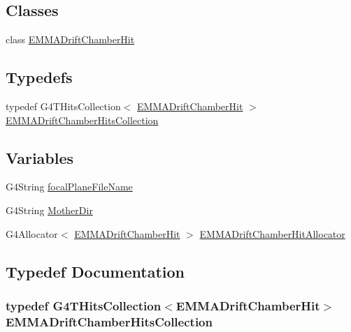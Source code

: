 \subsection*{Classes}
\begin{DoxyCompactItemize}
\item 
class \hyperlink{classEMMADriftChamberHit}{E\+M\+M\+A\+Drift\+Chamber\+Hit}
\end{DoxyCompactItemize}
\subsection*{Typedefs}
\begin{DoxyCompactItemize}
\item 
typedef G4\+T\+Hits\+Collection$<$ \hyperlink{classEMMADriftChamberHit}{E\+M\+M\+A\+Drift\+Chamber\+Hit} $>$ \hyperlink{EMMADriftChamberHit_8hh_a22ef55da69b903e8da573af3049cf972}{E\+M\+M\+A\+Drift\+Chamber\+Hits\+Collection}
\end{DoxyCompactItemize}
\subsection*{Variables}
\begin{DoxyCompactItemize}
\item 
G4\+String \hyperlink{EMMADriftChamberHit_8hh_a3dbaf7156a8d958508b9806a0ef50aa6}{focal\+Plane\+File\+Name}
\item 
G4\+String \hyperlink{EMMADriftChamberHit_8hh_a28a3faf9b4768b420044f0d81fa645b7}{Mother\+Dir}
\item 
G4\+Allocator$<$ \hyperlink{classEMMADriftChamberHit}{E\+M\+M\+A\+Drift\+Chamber\+Hit} $>$ \hyperlink{EMMADriftChamberHit_8hh_a69d77018fbd217765f66a3ea52ee314f}{E\+M\+M\+A\+Drift\+Chamber\+Hit\+Allocator}
\end{DoxyCompactItemize}


\subsection{Typedef Documentation}
\subsubsection[{\texorpdfstring{E\+M\+M\+A\+Drift\+Chamber\+Hits\+Collection}{EMMADriftChamberHitsCollection}}]{\setlength{\rightskip}{0pt plus 5cm}typedef G4\+T\+Hits\+Collection$<${\bf E\+M\+M\+A\+Drift\+Chamber\+Hit}$>$ {\bf E\+M\+M\+A\+Drift\+Chamber\+Hits\+Collection}}\hypertarget{EMMADriftChamberHit_8hh_a22ef55da69b903e8da573af3049cf972}{}\label{EMMADriftChamberHit_8hh_a22ef55da69b903e8da573af3049cf972}



